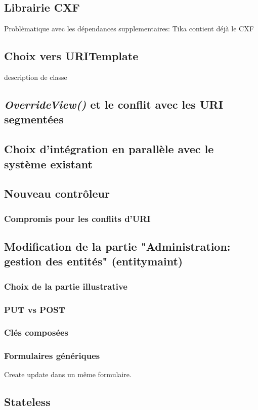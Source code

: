 \subsection{Librairie CXF}
Problèmatique avec les dépendances supplementaires: 
Tika contient déjà le CXF
\subsection{Choix vers URITemplate}
description de classe
\subsection{\textit{OverrideView()} et le conflit avec les URI segmentées}
\subsection{Choix d'intégration en parallèle avec le système existant }
\subsection{Nouveau contrôleur}
\subsubsection{Compromis pour les conflits d'URI}

\subsection{Modification de la partie "Administration: gestion des entités"  (entitymaint)  }
\subsubsection{Choix de la partie illustrative}
\subsubsection{PUT vs POST}
\subsubsection{Clés composées}
\subsubsection{Formulaires génériques }
Create update dans un même formulaire.
\subsection{Stateless}
